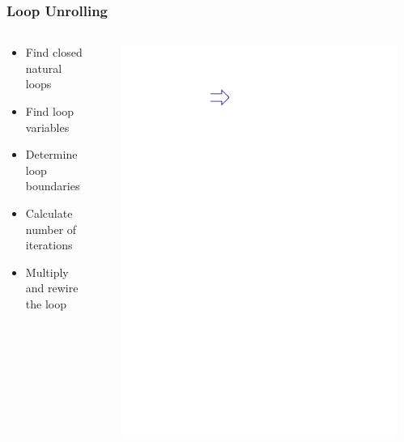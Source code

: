 \documentclass[navbaroff,en]{sdqbeamer}
\begin{document}
\begin{frame}
    \frametitle{Loop Unrolling}

	\begin{columns}
		\centering
		\begin{column}{0.4\textwidth}
			\begin{itemize}
				\item[1.] Find closed natural loops
				\item[2.] Find loop variables
				\item[3.] Determine loop boundaries
				\item[4.] Calculate number of iterations
				\vspace*{1em}
				\item[$\rightarrow$] Multiply and rewire the loop
			\end{itemize}
		\end{column}
		\begin{column}{0.2\textwidth}
			\centering
			\scalebox{0.2}{%
				
			}
		\end{column}
		\begin{column}{0.05\textwidth}
			\centering
			\includegraphics[scale=0.7]{images/arrow.ipe.pdf}
		\end{column}
		\begin{column}{0.15\textwidth}
			\centering
			\scalebox{0.14}{}
		\end{column}
	\end{columns}

\end{frame}
\end{document}

